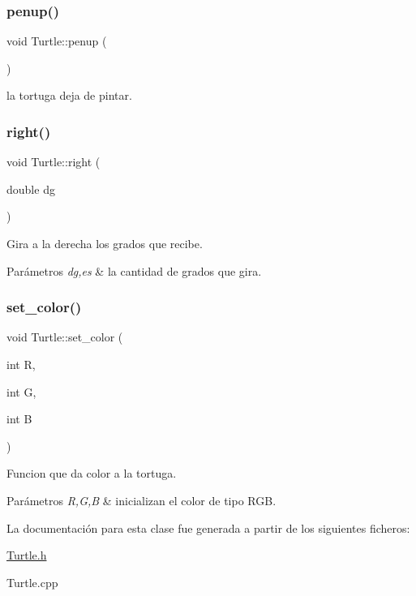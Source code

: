 \subsubsection{\texorpdfstring{penup()}{penup()}}
{\footnotesize\ttfamily void Turtle\+::penup (\begin{DoxyParamCaption}{ }\end{DoxyParamCaption})}

la tortuga deja de pintar. \mbox{\label{classTurtle_ad389432bb8cde6832c0fe1f76c891e94}} 
\subsubsection{\texorpdfstring{right()}{right()}}
{\footnotesize\ttfamily void Turtle\+::right (\begin{DoxyParamCaption}\item[{double}]{dg }\end{DoxyParamCaption})}

Gira a la derecha los grados que recibe. 
\begin{DoxyParams}{Parámetros}
{\em dg,es} & la cantidad de grados que gira. \\
\hline
\end{DoxyParams}
\mbox{\label{classTurtle_ad4f1cfec231a2d91c529d20c2331168b}} 
\subsubsection{\texorpdfstring{set\+\_\+color()}{set\_color()}}
{\footnotesize\ttfamily void Turtle\+::set\+\_\+color (\begin{DoxyParamCaption}\item[{int}]{R,  }\item[{int}]{G,  }\item[{int}]{B }\end{DoxyParamCaption})}

Funcion que da color a la tortuga. 
\begin{DoxyParams}{Parámetros}
{\em R,G,B} & inicializan el color de tipo R\+GB. \\
\hline
\end{DoxyParams}


La documentación para esta clase fue generada a partir de los siguientes ficheros\+:\begin{DoxyCompactItemize}
\item 
\hyperlink{Turtle_8h}{Turtle.\+h}\item 
Turtle.\+cpp\end{DoxyCompactItemize}
